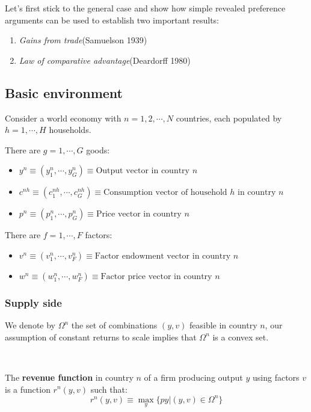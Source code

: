 Let's first stick to the general case and show how simple revealed preference arguments can be used to establish
two important results:
\begin{enumerate}
    \item \textit{Gains from trade}(Samuelson 1939)
    \item \textit{Law of comparative advantage}(Deardorff 1980)
\end{enumerate}

\subsection{Basic environment}
Consider a world economy with $n=1, 2, \cdots, N$ countries, each populated by $h=1, \cdots, H$ households.

There are $g=1, \cdots, G$ goods:
\begin{itemize}
    \item $y^n \equiv (y_1^n, \cdots, y_G^n) \equiv \text{Output vector in country } n$
    \item $c^{nh}  \equiv (c_1^{nh} , \cdots, c_G^{nh} ) \equiv \text{Consumption vector of household } h \text{ in country } n$
    \item $p^n \equiv (p_1^n, \cdots, p_G^n) \equiv \text{Price vector in country } n$
\end{itemize}

There are $f=1, \cdots, F$ factors:
\begin{itemize}
    \item $v^n \equiv (v_1^n, \cdots, v_F^n) \equiv \text{Factor endowment vector in country } n$
    \item $w^n \equiv (w_1^n, \cdots, w_F^n) \equiv \text{Factor price vector in country } n$
\end{itemize}

\subsubsection{Supply side}
We denote by $\Omega^n$ the set of combinations $(y, v)$ feasible in country $n$,
our assumption of constant returns to scale implies that $\Omega^n$ is a convex set.

\begin{definition}
    \label{def:revenuefunc}
    \

    The \textbf{revenue function} in country $n$ of a firm producing output $y$ using factors $v$ is a function $r^n(y, v)$ such that:
    \begin{equation}\label{eq:revenuefunc}
        r^n(y,v) \equiv \max_y \{py | (y, v) \in \Omega^n \}
    \end{equation}
\end{definition}


